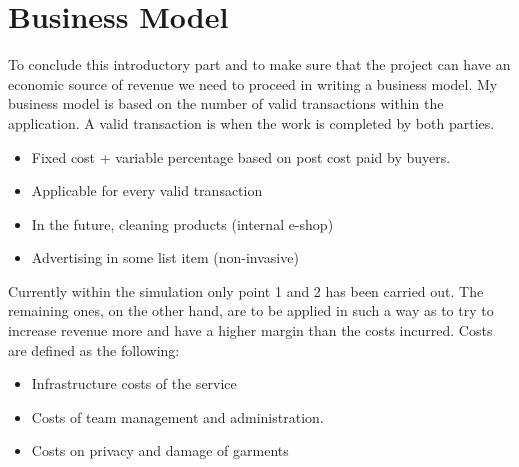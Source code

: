 \section{Business Model}
To conclude this introductory part and to make sure that the project can have an economic source of revenue we need to proceed in writing a business model. My business model is based on the number of valid transactions within the application.
A valid transaction is when the work is completed by both parties. 
\begin{itemize}
\item Fixed cost + variable percentage based on post cost paid by buyers.
\item Applicable for every valid transaction
\item In the future, cleaning products (internal e-shop)
\item Advertising in some list item (non-invasive)
\end{itemize}
Currently within the simulation only point 1 and 2 has been carried out. The remaining ones, on the other hand, are to be applied in such a way as to try to increase revenue more and have a higher margin than the costs incurred. Costs are defined as the following:
\begin{itemize}
\item Infrastructure costs of the service
\item Costs of team management and administration.
\item Costs on privacy and damage of garments
\end{itemize}